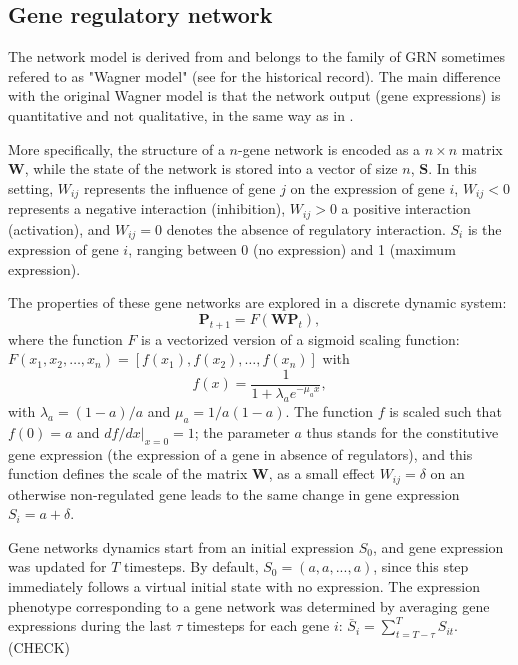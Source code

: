 \documentclass{article}
\begin{document}
\subsection{Gene regulatory network}

The network model is derived from \cite{Wag94,Wagner96} and belongs to the family of GRN sometimes refered to as "Wagner model" (see \cite{FierstPhuillips2016} for the historical record). The main difference with the original Wagner model is that the network output (gene expressions) is quantitative and not qualitative, in the same way as in \cite{SB02}. 

More specifically, the structure of a $n$-gene network is encoded as a $n\times n$ matrix $\bm W$, while the state of the network is stored into a vector of size $n$, $\bm S$. In this setting, $W_{ij}$ represents the influence of gene $j$ on the expression of gene $i$, $W_{ij} < 0$ represents a negative interaction (inhibition), $W_{ij} > 0$ a positive interaction (activation), and $W_{ij} = 0$ denotes the absence of regulatory interaction. $S_i$ is the expression of gene $i$, ranging between 0 (no expression) and 1 (maximum expression). 

The properties of these gene networks are explored in a discrete dynamic system:
\begin{equation}
 \bm P_{t+1} = F(\bm W \bm P_t),
\end{equation}
\noindent where the function $F$ is a vectorized version of a sigmoid scaling function: $F(x_1, x_2, \dots, x_n) = [f(x_1), f(x_2), \dots, f(x_n)]$ with
\begin{equation} \label{eq:fx}
f(x) = \frac{1}{1+ \lambda_a e ^{- \mu_a x}}, 
\end{equation}
\noindent with $\lambda_a = (1-a)/a$ and $\mu_a = 1/a(1-a)$. The function $f$ is scaled such that $f(0) = a$ and $df/dx|_{x=0}=1$; the parameter $a$ thus stands for the constitutive gene expression (the expression of a gene in absence of regulators), and this function defines the scale of the matrix $\bm W$, as a small effect $W_{ij} = \delta$ on an otherwise non-regulated gene leads to the same change in gene expression $S_i = a+\delta$. 

Gene networks dynamics start from an initial expression $S_0$, and gene expression was updated for $T$ timesteps. By default, $S_0 = (a, a, ..., a)$, since this step immediately follows a virtual initial state with no expression. The expression phenotype corresponding to a gene network was determined by averaging gene expressions during the last $\tau$ timesteps for each gene $i$: $\bar S_i = \sum_{t=T-\tau}^T S_{it}$. (CHECK) 
\end{document}
